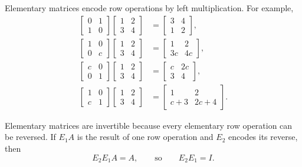 \documentclass[11pt]{article}
\begin{document}
Elementary matrices encode row operations by left multiplication.  For example,
\begin{align*}
\begin{bmatrix}0&1\\1&0\end{bmatrix}
\begin{bmatrix}1&2\\3&4\end{bmatrix}
&=\begin{bmatrix}3&4\\1&2\end{bmatrix},\\
\begin{bmatrix}1&0\\0&c\end{bmatrix}
\begin{bmatrix}1&2\\3&4\end{bmatrix}
&=\begin{bmatrix}1&2\\3c&4c\end{bmatrix},\\
\begin{bmatrix}c&0\\0&1\end{bmatrix}
\begin{bmatrix}1&2\\3&4\end{bmatrix}
&=\begin{bmatrix}c&2c\\3&4\end{bmatrix},\\
\begin{bmatrix}1&0\\c&1\end{bmatrix}
\begin{bmatrix}1&2\\3&4\end{bmatrix}
&=\begin{bmatrix}1&2\\c+3&2c+4\end{bmatrix}.
\end{align*}

Elementary matrices are invertible because every elementary row operation can be reversed.  If $E_1A$ is the result of one row operation and $E_2$ encodes its reverse, then
\[
E_2E_1A=A,
\qquad\text{so}\qquad E_2E_1=I.
\]
\end{document}
